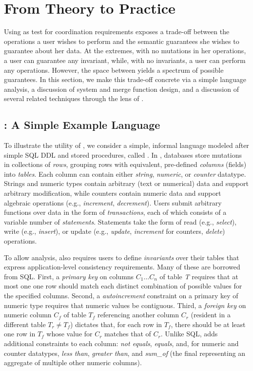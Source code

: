 
\section{From Theory to Practice}
\label{sec:bcc-practice}

Using \iconfluence as test for coordination requirements exposes a
trade-off between the operations a user wishes to perform and the
semantic guarantees she wishes to guarantee about her data. At the
extremes, with no mutations in her operations, a user can guarantee
any invariant, while, with no invariants, a user can perform any
operations. However, the space between yields a spectrum of possible
\iconfluent guarantees. In this section, we make this trade-off
concrete via a simple language analysis, a discussion of system and
merge function design, and a discussion of several related techniques
through the lens of \iconfluence.

\subsection{\lang: A Simple Example Language}

To illustrate the utility of \iconfluence, we consider a simple,
informal language modeled after simple SQL DDL and stored procedures,
called \lang. In \lang, databases store mutations in collections of
\textit{rows}, grouping rows with equivalent, pre-defined
\textit{columns} (fields) into \textit{tables}. Each column can
contain either \textit{string}, \textit{numeric}, or \textit{counter}
datatype. Strings and numeric types contain arbitrary (text or
numerical) data and support arbitrary modification, while counters
contain numeric data and support algebraic operations (e.g.,
\textit{increment}, \textit{decrement}). Users submit arbitrary
functions over data in the form of \textit{transactions}, each of
which consists of a variable number of \textit{statements}. Statements
take the form of read (e.g., \textit{select}), write (e.g.,
\textit{insert}), or update (e.g., \textit{update}, \textit{increment}
for counters, \textit{delete}) operations.

To allow \cfreedom analysis, \lang also requires users to define
\textit{invariants} over their tables that express application-level
consistency requirements. Many of these are borrowed from SQL. First,
a \textit{primary key} on columns $C_1 \dots C_n$ of table \textit{T}
requires that at most one one row should match each distinct
combination of possible values for the specified columns. Second, a
\textit{autoincrement} constraint on a primary key of numeric type
requires that numeric values be contiguous. Third, a \textit{foreign
  key} on numeric column $C_f$ of table $T_f$ referencing another
column $C_r$ (resident in a different table $T_r \neq T_f$) dictates
that, for each row in $T_f$, there should be at least one row in $T_f$
whose value for $C_r$ matches that of $C_r$. Unlike SQL, \lang adds
additional constraints to each column: \textit{not equals},
\textit{equals}, and, for numeric and counter datatypes, \textit{less
  than}, \textit{greater than}, and \textit{sum\_of} (the final
representing an aggregate of multiple other numeric columns).

